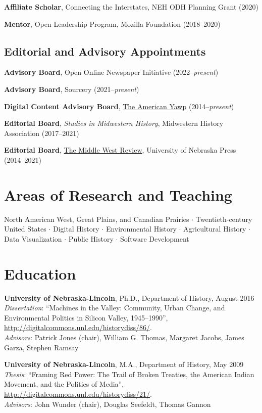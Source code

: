 \documentclass[10pt]{article}
\begin{document}
\textbf{Affiliate Scholar}, Connecting the Interstates, NEH ODH Planning Grant (2020)

\textbf{Mentor}, Open Leadership Program, Mozilla Foundation (2018--2020)

\subsection*{Editorial and Advisory Appointments}

\textbf{Advisory Board}, Open Online Newspaper Initiative (2022--\textit{present})

\textbf{Advisory Board}, Sourcery (2021--\textit{present})

\textbf{Digital Content Advisory Board}, \href{http://www.americanyawp.com/}{The American Yawp} (2014--\textit{present})

\textbf{Editorial Board}, \textit{Studies in Midwestern History}, Midwestern History Association (2017--2021)

\textbf{Editorial Board}, \href{https://uimiddle.wordpress.com/}{The Middle West Review}, University of Nebraska Press (2014--2021)


\section*{Areas of Research and Teaching}

North American West, Great Plains, and Canadian Prairies $\cdot$ Twentieth-century United States $\cdot$ Digital History $\cdot$ Environmental History $\cdot$ Agricultural History $\cdot$ Data Visualization $\cdot$ Public History $\cdot$ Software Development


\section*{Education}

\textbf{University of Nebraska-Lincoln}, Ph.D., Department of History, August 2016 \\
\textit{Dissertation}: ``Machines in the Valley: Community, Urban Change, and Environmental Politics in Silicon Valley, 1945--1990'', \url{http://digitalcommons.unl.edu/historydiss/86/}. \\
\textit{Advisors}: Patrick Jones (chair), William G. Thomas, Margaret Jacobs, James Garza, Stephen Ramsay

\textbf{University of Nebraska-Lincoln}, M.A., Department of History, May 2009 \\
\textit{Thesis}: ``Framing Red Power: The Trail of Broken Treaties, the American Indian Movement, and the Politics of Media'', \url{http://digitalcommons.unl.edu/historydiss/21/}. \\
\textit{Advisors}: John Wunder (chair), Douglas Seefeldt, Thomas Gannon
\end{document}
